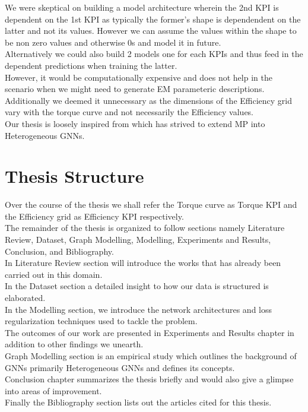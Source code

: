 \documentclass{report} %
\begin{document}
We were skeptical on building a model architecture wherein the 2nd KPI is dependent on the 1st KPI as typically the former's shape is dependendent on the latter and not its values.
However we can assume the values within the shape to be non zero values and otherwise 0s and model it in future.\\

Alternatively we could also build 2 models one for each KPIs and thus feed in the dependent predictions when training the latter. \\
However, it would be computationally expensive and does not help in the scenario when we might need to generate \ac{EM} parameteric descriptions.
Additionally we deemed it unnecessary as the dimensions of the Efficiency grid vary with the torque curve and not necessarily the Efficiency values. \\

Our thesis is loosely inspired from \cite{ML HGNN-2023} which has strived to extend \ac{MP} into Heterogeneous \ac{GNN}s.\\

\section{Thesis Structure}\label{sec:Thesis Structure}

Over the course of the thesis we shall refer the Torque curve as Torque KPI and the Efficiency grid as Efficiency KPI respectively.\\
The remainder of the thesis is organized to follow sections namely Literature Review, Dataset, Graph Modelling, Modelling, Experiments and Results, Conclusion, and Bibliography.\\
In Literature Review section will introduce the works that has already been carried out in this domain. \\
In the Dataset section a detailed insight to how our data is structured is elaborated.\\
In the Modelling section, we introduce the network architectures and loss regularization techniques used to tackle the problem. \\
The outcomes of our work are presented in Experiments and Results chapter in addition to other findings we unearth.\\ 
Graph Modelling section is an empirical study which outlines the background of \ac{GNN}s primarily Heterogeneous \ac{GNN}s and defines its concepts.\\
Conclusion chapter summarizes the thesis briefly and would also give a glimpse into areas of improvement. \\
Finally the Bibliography section lists out the articles cited for this thesis.\\
\end{document}

